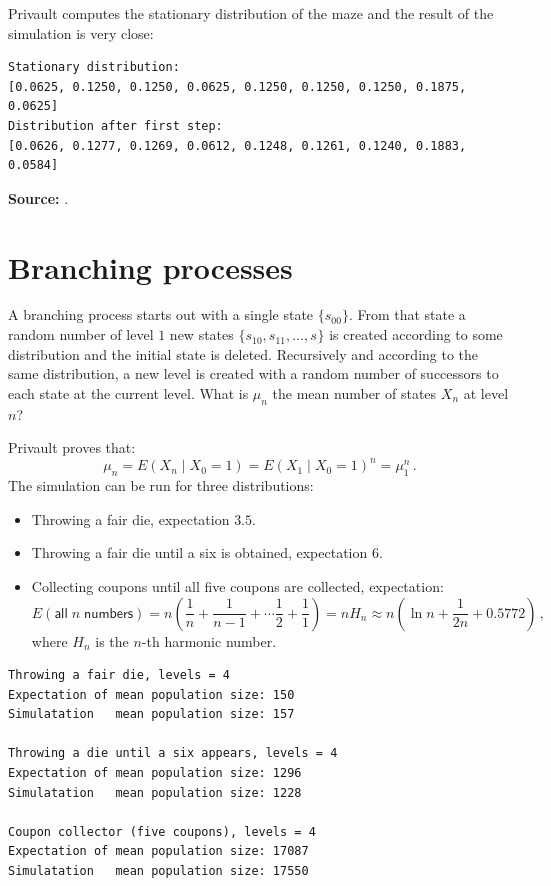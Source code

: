 \documentclass[11pt,a4paper]{article}
\begin{document}
Privault computes the stationary distribution of the maze and the result of the simulation is very close:
\begin{verbatim}
Stationary distribution:
[0.0625, 0.1250, 0.1250, 0.0625, 0.1250, 0.1250, 0.1250, 0.1875, 0.0625]
Distribution after first step:
[0.0626, 0.1277, 0.1269, 0.0612, 0.1248, 0.1261, 0.1240, 0.1883, 0.0584]\end{verbatim}

\textbf{Source:} \cite[Section 7.2]{privault}.


\section{Branching processes}\label{branching}

A branching process starts out with a single state $\{s_{00}\}$. From that state a random number of level $1$ new states $\{s_{10}, s_{11}, \ldots, s_{}\}$ is created according to some distribution and the initial state is deleted. Recursively and according to the same distribution, a new level is created with a random number of successors to each state at the current level. What is $\mu_n$ the mean number of states $X_n$ at level $n$?

Privault proves that:
\[
\mu_n = E(X_n \mid X_0=1) = E(X_1 \mid X_0=1)^n = \mu_1^n\,.
\]
The simulation can be run for three distributions:
\begin{itemize}
\item Throwing a fair die, expectation $3.5$.
\item Throwing a fair die until a six is obtained, expectation $6$.
\item Collecting coupons until all five coupons are collected, expectation:
\[
E(\textsf{all}\;n \;\textsf{numbers}) = n\left(\frac{1}{n}+\frac{1}{n-1} + \cdots \frac{1}{2} + \frac{1}{1}\right) =nH_n\approx n\left(\ln n + \frac{1}{2n} + 0.5772\right)\,,
\]
where $H_n$ is the $n$-th harmonic number.
\end{itemize}

\begin{verbatim}
Throwing a fair die, levels = 4
Expectation of mean population size: 150
Simulatation   mean population size: 157

Throwing a die until a six appears, levels = 4
Expectation of mean population size: 1296
Simulatation   mean population size: 1228

Coupon collector (five coupons), levels = 4
Expectation of mean population size: 17087
Simulatation   mean population size: 17550
\end{verbatim}
\end{document}
